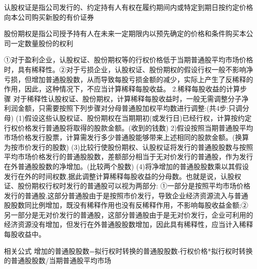 \documentclass[UTF8,12pt]{ctexart}
\numberwithin{equation}{section} %
\numberwithin{figure}{section}
\numberwithin{table}{section}
\begin{document}
	认股权证是指公司发行的、约定持有人有权在履约期间内或特定到期日按约定价格向本公司购买新股的有价证券
	
	股份期权是指公司授予持有人在未来一定期限内以预先确定的价格和条件购买本公司一定数量股份的权利
	
	①对于盈利企业，认股权证、股份期权等的行权价格低于当期普通股平均市场价格时，具有稀释性。②对于亏损企业，认股权证、股份期权的假设行权一般不影响净亏损，但增加普通股股数，从而导致每股亏损金额的减少，实际上产生了反稀释的作用，因此，这种情况下，不应当计算稀释每股收益。
	2.稀释每股收益的计算步骤
	对于稀释性认股权证、股份期权，计算稀释每股收益时，一般无需调整分子净利润金额，只需要按照下列步骤对分母普通股加权平均数进行调整:(共4步:只调分母)
	(1)假设这些认股权证、股份期权在当期期初(或发行日)已经行权，计算按约定行权价格发行普通股将取得的股款金额。(收到的钱数)
	2)假设按照当期普通股平均市场价格发行股票，计算需发行多少普通股能够带来上述相同的股款金额。(换算为按市价发行的股数)
	(3)比较行使股份期权、认股权证将发行的普通股股数与按照平均市场价格发行的普通股股数，差额部分相当于无对价发行的普通股，作为发行在外普通股股数的净增加。(比较两个股数)
	(4)将净增加的普通股股数乘以其假设发行在外的时间权数,据此调整计算稀释每股收益的分母数。也就是说，认股权证、股份期权行权时发行的普通股可以视为两部分:
	①一部分是按照平均市场价格发行的普通股,这部分普通股由于是按照市价发行，导致企业经济资源流入与普通股股数同比例增加，既没有稀释作用也没有反稀释作用，不影响每股收益金额;②另一部分是无对价发行的普通股，这部分普通股由于是无对价发行，企业可利用的经济资源没有增加，但发行在外普通股股数增加，因此具有稀释性，应当计入稀释每股收益中。
	
	相关公式
	增加的普通股股数=拟行权时转换的普通股股数-行权价格*拟行权时转换的普通股股数/当期普通股平均市场
	
\end{document}
